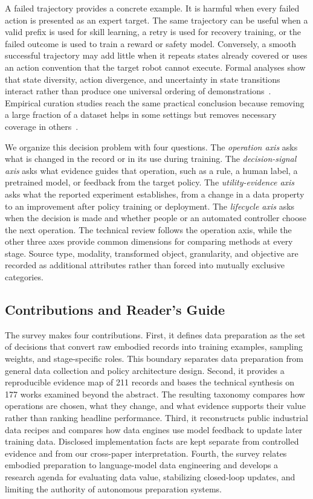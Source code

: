 A failed trajectory provides a concrete example.
It is harmful when every failed action is presented as an expert target.
The same trajectory can be useful when a valid prefix is used for skill learning, a retry is used for recovery training, or the failed outcome is used to train a reward or safety model.
Conversely, a smooth successful trajectory may add little when it repeats states already covered or uses an action convention that the target robot cannot execute.
Formal analyses show that state diversity, action divergence, and uncertainty in state transitions interact rather than produce one universal ordering of demonstrations~\cite{belkhale2023data_2306_02437}.
Empirical curation studies reach the same practical conclusion because removing a large fraction of a dataset helps in some settings but removes necessary coverage in others~\cite{hejna2025robot_2502_08623,bedi2026what_2606_10229}.

We organize this decision problem with four questions.
The \emph{operation axis} asks what is changed in the record or in its use during training.
The \emph{decision-signal axis} asks what evidence guides that operation, such as a rule, a human label, a pretrained model, or feedback from the target policy.
The \emph{utility-evidence axis} asks what the reported experiment establishes, from a change in a data property to an improvement after policy training or deployment.
The \emph{lifecycle axis} asks when the decision is made and whether people or an automated controller choose the next operation.
The technical review follows the operation axis, while the other three axes provide common dimensions for comparing methods at every stage.
Source type, modality, transformed object, granularity, and objective are recorded as additional attributes rather than forced into mutually exclusive categories.

\subsection{Contributions and Reader's Guide}

The survey makes four contributions.
First, it defines data preparation as the set of decisions that convert raw embodied records into training examples, sampling weights, and stage-specific roles.
This boundary separates data preparation from general data collection and policy architecture design.
Second, it provides a reproducible evidence map of 211 records and bases the technical synthesis on 177 works examined beyond the abstract.
The resulting taxonomy compares how operations are chosen, what they change, and what evidence supports their value rather than ranking headline performance.
Third, it reconstructs public industrial data recipes and compares how data engines use model feedback to update later training data.
Disclosed implementation facts are kept separate from controlled evidence and from our cross-paper interpretation.
Fourth, the survey relates embodied preparation to language-model data engineering and develops a research agenda for evaluating data value, stabilizing closed-loop updates, and limiting the authority of autonomous preparation systems.

